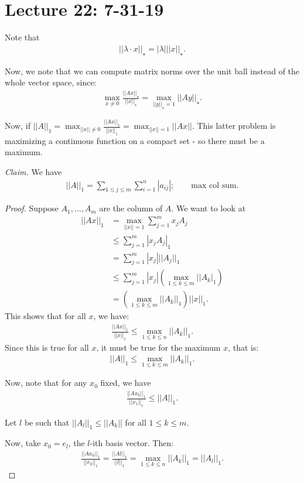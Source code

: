 \documentclass{article}
\begin{document}
\section{Lecture 22: 7-31-19}

Note that
\begin{align*}
  || \lambda \cdot x ||_{\star} = |\lambda| || x||_{\star}.
\end{align*}

Now, we note that we can compute matrix norms over the unit ball instead of the whole vector space, since:
\begin{align*}
  \max_{x \neq 0} \frac{||A x||_{\star}}{||x||_{\star}} = \max_{||y||_{\star} = 1} ||A y||_{\star}.
\end{align*}

Now, if $||A||_1 = \max_{||x|| \neq 0} \frac{||A x||_1}{||x||_1} = \max_{||x||=1} ||A x||$.  This latter problem is maximizing a continuous function on a compact set - so there must be a maximum.

{\it Claim.} We have
\begin{align*}
  ||A||_1 = \sum_{1 \leq j \leq m} \sum_{i=1}^{n} |a_{ij}|; \qquad \text{max col sum.}
\end{align*}

\begin{proof}
  Suppose $A_1, \dots, A_m$ are the column of $A$.  We want to look at
  \begin{align*}
    ||A x||_1 &= \max_{||x||=1} \sum_{j=1}^{m} x_j A_j \\
    & \leq \sum_{j=1}^{m} |x_j A_j|_1 \\
    & = \sum_{j=1}^{m} |x_j| ||A_j||_1 \\
    & \leq \sum_{j=1}^{m} |x_j| \left( \max_{1 \leq k \leq m} ||A_k|_1 \right) \\
    &= \left( \max_{1 \leq k \leq m} ||A_k ||_1 \right) ||x||_1.
  \end{align*}
  This shows that for all $x$, we have:
  \begin{align*}
    \frac{||A x||_1}{||x||_1} \leq \max_{1 \leq k \leq n} ||A_k||_1.
  \end{align*}
  Since this is true for all $x$, it must be true for the maximum $x$, that is:
  \begin{align*}
    ||A||_1 \leq \max_{1 \leq k \leq m} ||A_k||_1.
  \end{align*}

  Now, note that for any $x_0$ fixed, we have
  \begin{align*}
    \frac{||A x_0||_1}{||x_1||_1} \leq ||A||_1.
  \end{align*}

  Let $l$ be such that $||A_l||_1 \leq ||A_k||$ for all $1 \leq k \leq m$.

  Now, take $x_0 = e_l$, the $l$-ith basis vector.  Then:
  \begin{align*}
    \frac{||A x_0||_1}{||x_0||_1} = \frac{||A l||_1}{||l||_1} = \max_{1 \leq k \leq n} ||A_k||_1 = ||A_l||_1.
  \end{align*}
\end{proof}
\end{document}
